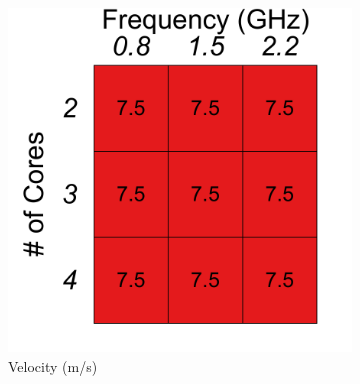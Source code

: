 
{
\begin{figure}[t!]
    	\centering
    	\begin{subfigure}[t!]{.3\columnwidth}
    	\centering
    		\includegraphics[width=\columnwidth]{figs/scanning_velocity_operating_point}
    		\caption{Velocity (m/s)}
            \label{fig:benchmarks:OPA:scanning:velocity}
    	\end{subfigure}
        \begin{subfigure}[t!]{.3\columnwidth}
    	\centering 

\end{subfigure}
\end{figure}}
